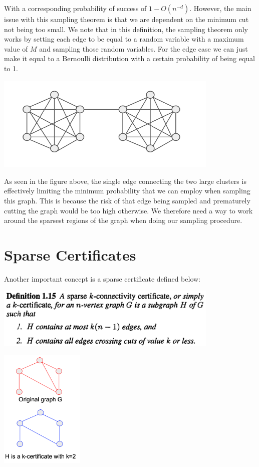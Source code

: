 \documentclass[11pt]{article}
\begin{document}
With a corresponding probability of success of $1 - O(n^{-d})$. However, the main issue with this sampling theorem is that we are dependent on the minimum cut not being too small. We note that in this definition, the sampling theorem only works by setting each edge to be equal to a random variable with a maximum value of $M$ and sampling those random variables. For the edge case we can just make it equal to a Bernoulli distribution with a certain probability of being equal to 1. 

\begin{center}
\includegraphics[width=0.8\textwidth]{figures/dumbell.png}
\end{center}

As seen in the figure above, the single edge connecting the two large clusters is effectively limiting the minimum probability that we can employ when sampling this graph. This is because the risk of that edge being sampled and prematurely cutting the graph would be too high otherwise. We therefore need a way to work around the sparsest regions of the graph when doing our sampling procedure. 

\section{Sparse Certificates}

Another important concept is a sparse certificate defined below:

\begin{center}
\includegraphics[width=0.8\textwidth]{figures/Def1_15.png}
\end{center}

\begin{center}
\includegraphics[width=0.3\textwidth]{figures/certificates.png}
\end{center}
\end{document}
